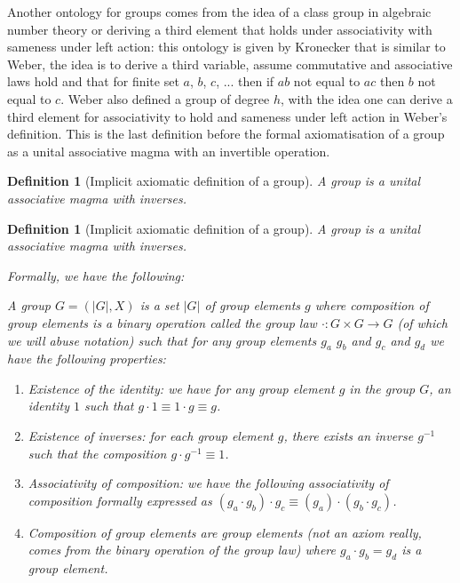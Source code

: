 \documentclass{tufte-book}
\newtheorem{definition}[theorem]{Definition}
\begin{document}
Another ontology for groups comes from the idea of a class group in algebraic number theory or deriving a third element that holds under associativity with sameness under left action: this ontology is given by Kronecker that is similar to Weber, the idea is to derive a third variable, assume commutative and associative laws hold and that for finite set $a$, $b$, $c$, ... then if $ab$ not equal to $ac$ then $b$ not equal to $c$. Weber also defined a group of degree $h$, with the idea one can derive a third element for associativity to hold and sameness under left action in Weber's definition. This is the last definition before the formal axiomatisation of a group as a unital associative magma with an invertible operation.

\begin{definition}[Implicit axiomatic definition of a group]
  A group is a unital associative magma with inverses.
\end{definition}

\begin{definition}[Implicit axiomatic definition of a group]
  A group is a unital associative magma with inverses.

  Formally, we have the following:

  A group $G = (|G|, X)$ is a set $|G|$ 
  of group elements $g$
  where composition of group elements is a
  binary operation called the group law $\cdot: G \times G \rightarrow G$ (of which we will abuse notation)
  such that for any group elements $g_a$ $g_b$ and $g_c$ and $g_d$ we have the following properties:
  
  \begin{enumerate}
	\item Existence of the identity: we have for any group element $g$ in the group $G$, an identity $1$ such that $g \cdot 1 \equiv 1 \cdot g \equiv g$.
	\item Existence of inverses: for each group element $g$, there exists an inverse $g^{-1}$ such that the composition $g \cdot g^{-1} \equiv 1$.
	\item Associativity of composition: we have the following associativity of composition formally expressed as $(g_a \cdot g_b) \cdot g_c \equiv (g_a) \cdot (g_b \cdot g_c)$.
	\item Composition of group elements are group elements (not an axiom really, comes from the binary operation of the group law) where $g_a \cdot g_b = g_d$ is a group element.
  \end{enumerate}
\end{definition}
\end{document}
